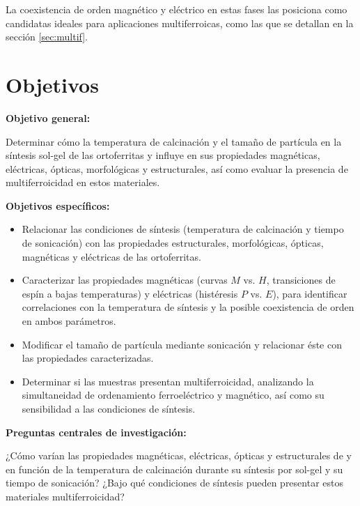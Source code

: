 \documentclass[../main.tex]{subfiles}
\begin{document}
La coexistencia de orden magnético y eléctrico en estas fases las posiciona como candidatas ideales para aplicaciones multiferroicas, como las que se detallan en la sección \ref{sec:multif}.
\chapter{Objetivos}
\textbf{Objetivo general:}

Determinar cómo la temperatura de calcinación y el tamaño de partícula en la síntesis sol-gel de las ortoferritas \neod{} y \sama{} influye en sus propiedades magnéticas, eléctricas, ópticas, morfológicas y estructurales, así como evaluar la presencia de multiferroicidad en estos materiales.

\textbf{Objetivos específicos:}
\begin{itemize}
    \item Relacionar las condiciones de síntesis (temperatura de calcinación y tiempo de sonicación) con las propiedades estructurales, morfológicas, ópticas, magnéticas y eléctricas de las ortoferritas.
    \item Caracterizar las propiedades magnéticas (curvas $M$ vs. $H$, transiciones de espín a bajas temperaturas) y eléctricas (histéresis $P$ vs. $E$), para identificar correlaciones con la temperatura de síntesis y la posible coexistencia de orden en ambos parámetros.
    \item Modificar el tamaño de partícula mediante sonicación y relacionar éste con las propiedades caracterizadas.
    \item Determinar si las muestras presentan multiferroicidad, analizando la simultaneidad de ordenamiento ferroeléctrico y magnético, así como su sensibilidad a las condiciones de síntesis.
\end{itemize}
\textbf{Preguntas centrales de investigación:}

¿Cómo varían las propiedades magnéticas, eléctricas, ópticas y estructurales de \neod{} y \sama{} en función de la temperatura de calcinación durante su síntesis por sol-gel y su tiempo de sonicación? ¿Bajo qué condiciones de síntesis pueden presentar estos materiales multiferroicidad?
\end{document}

